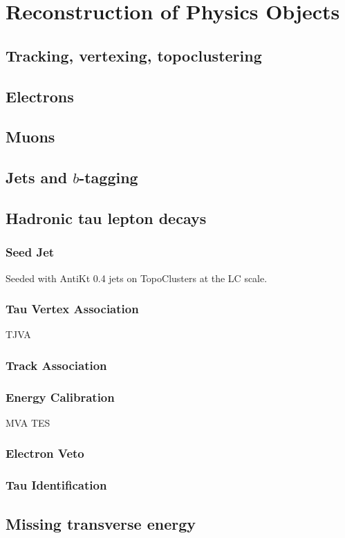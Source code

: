 \section{Reconstruction of Physics Objects}
\subsection{Tracking, vertexing, topoclustering}
\subsection{Electrons}
\subsection{Muons}
\subsection{Jets and $b$-tagging}

\subsection{Hadronic tau lepton decays}

\subsubsection{Seed Jet}

Seeded with AntiKt 0.4 jets on TopoClusters at the LC scale.

\subsubsection{Tau Vertex Association}

TJVA

\subsubsection{Track Association}

\cite{duschinger}

\subsubsection{Energy Calibration}

MVA TES

\subsubsection{Electron Veto}
\subsubsection{Tau Identification}


\subsection{Missing transverse energy}

